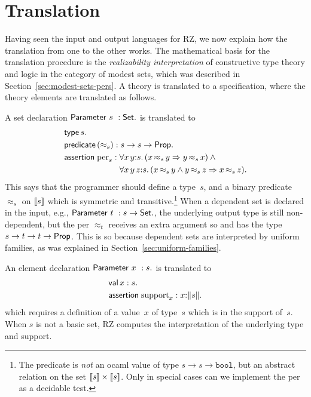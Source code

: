 \section{Translation}
\label{sec:translation}

Having seen the input and output languages for RZ, we now explain how
the translation from one to the other works. The mathematical basis
for the translation procedure is the \emph{realizability
  interpretation} of constructive type theory and logic in the
category of modest sets, which was described in
Section~\ref{sec:modest-sets-pers}. A theory is translated to a
specification, where the theory elements are translated as follows.

A set declaration $\mathsf{Parameter}\ s\ : \mathsf{Set}.$ is translated to
%
\begin{align*}
  & \otyspec{s}. \\
  & \opropspec{({\approx_{s}})}{\oarrow{s}{\oarrow{s}{\oProp}}}.\\
  & \oassertion{\mathrm{per}_{s}}{
    \begin{aligned}[t]
      & \oforall{x\,y}{s}{(\oimply{\oper{s}{x}{y}}{\oper{s}{y}{x}})}
        \land {} \\
      & \oforall{x\,y\,z}{s}{(
        \oimply{
          \oper{s}{x}{y} \land \oper{s}{y}{z}
          }{\oper{s}{x}{z}}
        )}.
    \end{aligned}
  }
\end{align*}
%
This says that the programmer should define a type~$s$, and a binary
predicate~$\approx_s$ on $[\![s]\!]$ which is symmetric and
transitive.\footnote{The predicate is \emph{not} an ocaml value of
  type $s \to s \to \mathtt{bool}$, but an abstract relation on the
  set $[\![s]\!] \times [\![s]\!]$. Only in special cases can we
  implement the per as a decidable test.} When a dependent set is
declared in the input, e.g., $\mathsf{Parameter}\ t\ : s \to \mathsf{Set}.$, the
underlying output type is still non-dependent, but the per $\approx_t$
receives an extra argument so and has the type
$s \to t \to t \to \mathsf{Prop}$. This is so because
dependent sets are interpreted by uniform families, as was explained
in Section~\ref{sec:uniform-families}.

An element declaration $\mathsf{Parameter}\ x\ : s.$ is translated to
%
\begin{align*}
  & \mathsf{val}\,x:s. \\
  & \mathsf{assertion}\; \mathrm{support}_x : x{:}\|s\|.
\end{align*}
%
which requires a definition of a value~$x$ of type~$s$ which is in the
support of~$s$. When $s$ is not a basic set, RZ computes the
interpretation of the underlying type and support.

